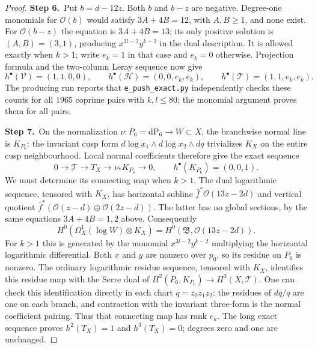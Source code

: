 \begin{proof}
\par\smallskip\noindent\textbf{Step 6.}\ Put $b=d-12z$.  Both $b$ and $b-z$ are negative.
Degree-one monomials for $\mathcal O(b)$ would satisfy
$3A+4B=12$, with $A,B\ge1$, and none exist.
For $\mathcal O(b-z)$ the equation is $3A+4B=13$;
its only positive solution is $(A,B)=(3,1)$, producing
$x^{3l-2}y^{k-2}$ in the dual description.  It is allowed
exactly when $k>1$; write $e_k=1$ in that case and $e_k=0$
otherwise.  Projection formula and the two-column Leray sequence
now give
\[
 h^\bullet(\mathcal V)=(1,1,0,0),\qquad
 h^\bullet(\mathcal H)=(0,0,e_k,e_k),\qquad
 h^\bullet(\mathcal T)=(1,1,e_k,e_k).
\]
The producing run reports that \texttt{e\_push\_exact.py} independently checks these
counts for all $1965$ coprime pairs with $k,l\le80$; the monomial
argument proves them for all pairs.

\par\smallskip\noindent\textbf{Step 7.}\ On the normalization $\nu:P_6=\mathrm{dP}_6\to W\subset X$,
the branchwise normal line is $K_{P_6}$: the invariant cusp form
$d\log x_1\wedge d\log x_2\wedge dq$ trivializes $K_X$
on the entire cusp neighbourhood.  Local normal coefficients
therefore give the exact sequence
\[
 0\longrightarrow\mathcal T\longrightarrow T_X
 \longrightarrow\nu_*K_{P_6}\longrightarrow0,
 \qquad h^\bullet(K_{P_6})=(0,0,1).
\]
We must determine its connecting map when $k>1$.
The dual logarithmic sequence, tensored with $K_X$, has horizontal
subline $\bar f^*\mathcal O(13z-2d)$ and vertical quotient
$\bar f^*(\mathcal O(z-d)\oplus\mathcal O(2z-d))$.
The latter has no global sections, by the same equations
$3A+4B=1,2$ above.  Consequently
\[
 H^0(\Omega_X^1(\log W)\otimes K_X)
 =H^0(\mathfrak B,\mathcal O(13z-2d)).
\]
For $k>1$ this is generated by the monomial
$x^{3l-2}y^{k-2}$ multiplying the horizontal logarithmic
differential.  Both $x$ and $y$ are nonzero over $p_0$, so its
residue on $P_6$ is nonzero.  The ordinary logarithmic residue
sequence, tensored with $K_X$, identifies this residue map with
the Serre dual of
$H^2(P_6,K_{P_6})\to H^3(X,\mathcal T)$.
One can check this identification directly in each chart
$q=z_0z_1z_2$: the residues of $dq/q$ are one on each branch,
and contraction with the invariant three-form is the normal
coefficient pairing.  Thus that connecting map has rank $e_k$.
The long exact sequence proves $h^2(T_X)=1$ and $h^3(T_X)=0$;
degrees zero and one are unchanged.


\end{proof}
